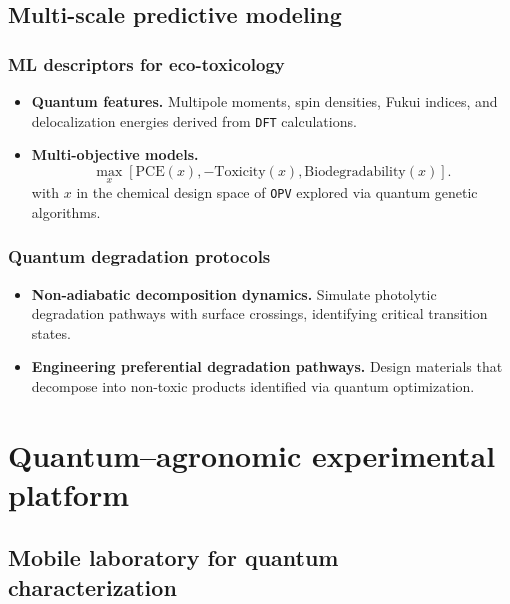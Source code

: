\documentclass[12pt, a4paper]{article}
\begin{document}
\subsection{Multi-scale predictive modeling}

\subsubsection{ML descriptors for eco-toxicology}

\begin{itemize}
    \item \textbf{Quantum features.} Multipole moments, spin densities, Fukui indices, and delocalization energies derived from \texttt{DFT} calculations.
    
    \item \textbf{Multi-objective models.}
    \begin{equation}
    \max_{x} [\text{PCE}(x), -\text{Toxicity}(x), \text{Biodegradability}(x)].
    \end{equation}
    with $x$ in the chemical design space of \texttt{OPV} explored via quantum genetic algorithms.
\end{itemize}

\subsubsection{Quantum degradation protocols}

\begin{itemize}
    \item \textbf{Non-adiabatic decomposition dynamics.} Simulate photolytic degradation pathways with surface crossings, identifying critical transition states.
    
    \item \textbf{Engineering preferential degradation pathways.} Design materials that decompose into non-toxic products identified via quantum optimization.
\end{itemize}

\section{Quantum–agronomic experimental platform}

\subsection{Mobile laboratory for quantum characterization}
\end{document}
